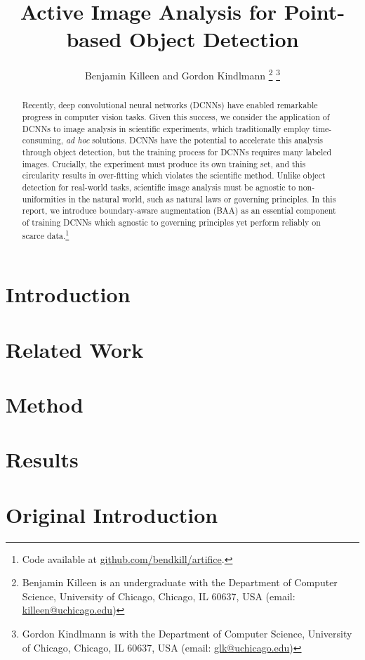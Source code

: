 \documentclass[10pt, draftcls]{IEEEtran}
\title{Active Image Analysis for Point-based Object Detection}
\author{Benjamin Killeen and Gordon Kindlmann %
  \thanks{Benjamin Killeen is an undergraduate with the Department of Computer
    Science, University of Chicago, Chicago, IL 60637, USA (email:
    \href{mailto:killeen@uchicago.edu}{killeen@uchicago.edu})} %
  \thanks{Gordon Kindlmann is with the Department of Computer Science, 
    University of Chicago, Chicago, IL 60637, USA (email:
    \href{mailto:glk@uchicago.edu}{glk@uchicago.edu})} %
}
\begin{document}
\maketitle

\begin{abstract}
  
  Recently, deep convolutional neural networks (DCNNs) have enabled remarkable
  progress in computer vision tasks. Given this success, we consider the
  application of DCNNs to image analysis in scientific experiments, which
  traditionally employ time-consuming, \emph{ad hoc} solutions. DCNNs have the
  potential to accelerate this analysis through object detection, but the
  training process for DCNNs requires many labeled images. Crucially, the
  experiment must produce its own training set, and this circularity results in
  over-fitting which violates the scientific method. Unlike object detection for
  real-world tasks, scientific image analysis must be agnostic to
  non-uniformities in the natural world, such as natural laws or governing
  principles. In this report, we introduce boundary-aware augmentation (BAA) as
  an essential component of training DCNNs which agnostic to governing
  principles yet perform reliably on scarce data.\footnote{Code available at
    \href{https://github.com/bendkill/artifice} {github.com/bendkill/artifice}.}
\end{abstract}

\section{Introduction}
\label{sec:introduction}

\section{Related Work}
\label{sec:related-work}

% 

\section{Method}
\label{sec:method}

\section{Results}
\label{sec:results}



\section{Original Introduction}
\label{sec:orig-intr}
\end{document}
